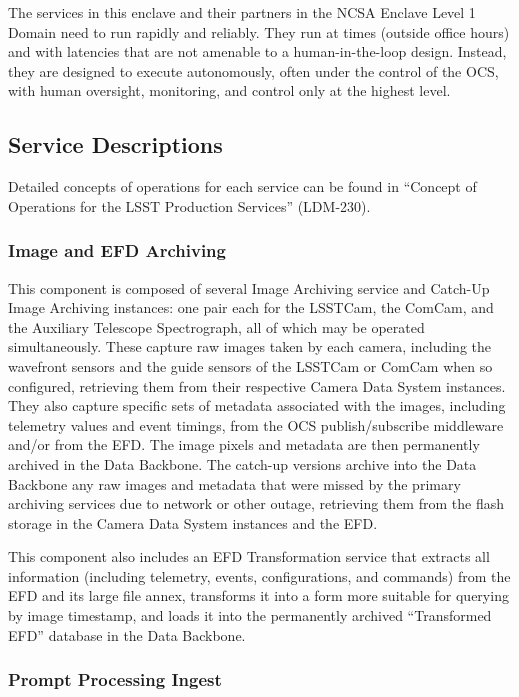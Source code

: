 \documentclass[DM,lsstdraft,toc]{lsstdoc}
\begin{document}
The services in this enclave and their partners in the NCSA Enclave
Level 1 Domain need to run rapidly and reliably. They run at times
(outside office hours) and with latencies that are not amenable to a
human-in-the-loop design. Instead, they are designed to execute
autonomously, often under the control of the OCS, with human oversight,
monitoring, and control only at the highest level.

\subsection{Service Descriptions}\label{base-service-descriptions}

Detailed concepts of operations for each service can be found in
``Concept of Operations for the LSST Production Services'' (LDM-230).


\subsubsection{Image and EFD Archiving}\label{image-and-efd-archiving}

This component is composed of several Image Archiving service and
Catch-Up Image Archiving instances: one pair each for the LSSTCam, the
ComCam, and the Auxiliary Telescope Spectrograph, all of which may be
operated simultaneously. These capture raw images taken by each camera,
including the wavefront sensors and the guide sensors of the LSSTCam or
ComCam when so configured, retrieving them from their respective Camera
Data System instances. They also capture specific sets of metadata
associated with the images, including telemetry values and event
timings, from the OCS publish/subscribe middleware and/or from the EFD.
The image pixels and metadata are then permanently archived in the Data
Backbone. The catch-up versions archive into the Data Backbone any raw
images and metadata that were missed by the primary archiving services
due to network or other outage, retrieving them from the flash storage
in the Camera Data System instances and the EFD.

This component also includes an EFD Transformation service that extracts
all information (including telemetry, events, configurations, and
commands) from the EFD and its large file annex, transforms it into a
form more suitable for querying by image timestamp, and loads it into
the permanently archived ``Transformed EFD'' database in the Data
Backbone.

\subsubsection{Prompt Processing Ingest}\label{prompt-processing-ingest}
\end{document}
